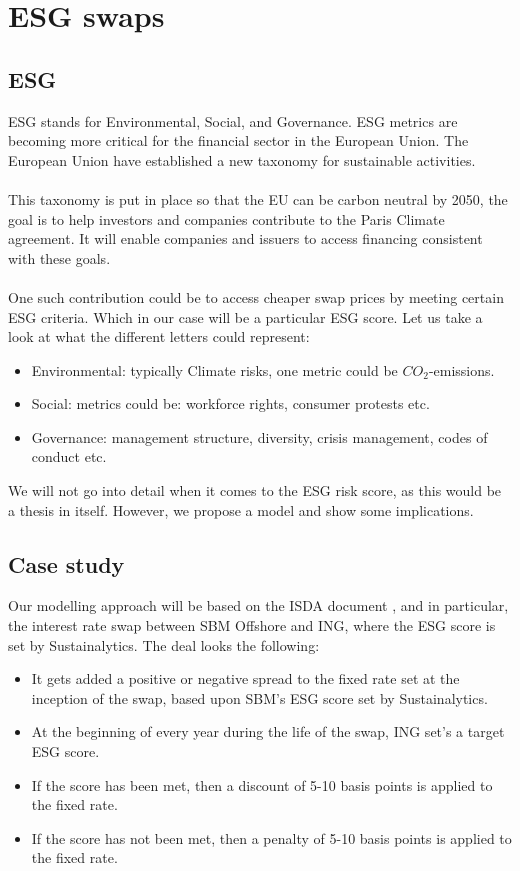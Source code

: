 \chapter{ESG swaps}


\section{ESG}
ESG  stands for Environmental, Social, and Governance. ESG metrics are becoming more critical for the financial sector in the European Union. The European Union have established a new taxonomy \cite{EU:2021} for sustainable activities. 
\\~\\
This taxonomy is put in place so that the EU can be carbon neutral by 2050, the goal is to help investors and companies contribute to the Paris Climate agreement. It will enable companies and issuers to access financing consistent with these goals.
\\~\\ 
One such contribution could be to access cheaper swap prices by meeting certain ESG criteria. Which in our case will be a particular ESG score. Let us take a look at what the different letters could represent:
\begin{itemize}
    \item Environmental: typically Climate risks, one metric could be $CO_{2}$-emissions. 
    \item Social: metrics could be: workforce rights, consumer protests etc. 
    \item Governance: management structure, diversity, crisis management, codes of conduct etc. 
\end{itemize}

We will not go into detail when it comes to the ESG risk score, as this would be a thesis in itself. However, we propose a model and show some implications. 

\newpage 

\section{Case study}
Our modelling approach will be based on the ISDA document \cite{ISDA:2021}, and in particular, the interest rate swap between SBM Offshore and ING, where the ESG score is set by Sustainalytics. The deal looks the following:
\begin{itemize}
    \item It gets added a positive or negative spread to the fixed rate set at the inception of the swap, based upon SBM's ESG score set by Sustainalytics. 
    \item At the beginning of every year during the life of the swap, ING set's a target ESG score.
    \item If the score has been met, then a discount of 5-10 basis points is applied to the fixed rate.
    \item If the score has not been met, then a penalty of 5-10 basis points is applied to the fixed rate. 
\end{itemize} 

